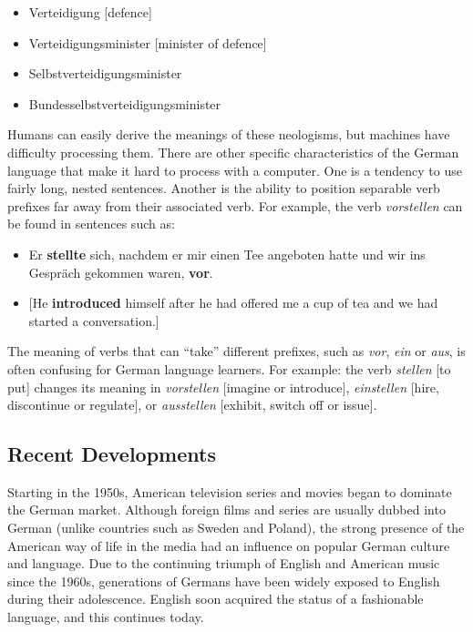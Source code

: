 \documentclass[]{../../metanetpaper}
\begin{document}
\begin{multicols}{2}
\begin{itemize}
\item Verteidigung [defence] 
\item Verteidigungsminister [minister of defence]
\item Selbstverteidigungsminister
\item Bundesselbstverteidigungsminister 
\end{itemize}
   
Humans can easily derive the meanings of these neologisms, but machines have difficulty processing them. There are other specific characteristics of the German language that make it hard to process with a computer. One is a tendency to use fairly long, nested sentences. Another is the ability to position separable verb prefixes far away from their associated verb. For example, the verb \textit{vorstellen} can be found in sentences such as:

\begin{itemize}
\item Er \textbf{stellte} sich, nachdem er mir einen Tee angeboten hatte und wir ins Gespräch gekommen waren, \textbf{vor}.
\item {[}He \textbf{introduced} himself after he had offered me a cup of tea and we had started a conversation.{]} 
\end{itemize}

The meaning of verbs that can “take” different prefixes, such as \textit{vor}, \textit{ein} or \textit{aus}, is often confusing for German language learners. For example: the verb \textit{stellen} {[}to put{]} changes its meaning in \textit{vorstellen} {[}imagine or introduce{]}, \textit{einstellen} {[}hire, discontinue or regulate{]}, or \textit{ausstellen} {[}exhibit, switch off or issue{]}.


\subsection{Recent Developments}

Starting in the 1950s, American television series and movies began to dominate the German market. Although foreign films and series are usually dubbed into German (unlike countries such as Sweden and Poland), the strong presence of the American way of life in the media had an influence on popular German culture and language. Due to the continuing triumph of English and American music since the 1960s, generations of Germans have been widely exposed to English during their adolescence. English soon acquired the status of a fashionable language, and this continues today.


\end{multicols}
\end{document}
